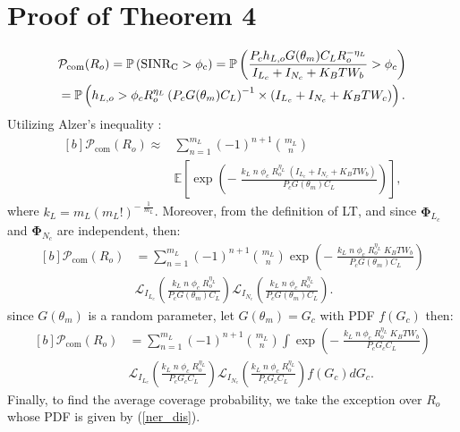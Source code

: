 \documentclass[journal]{IEEEtran}
\begin{document}
\section{Proof of Theorem 4}
\small
\begin{equation}
\begin{aligned}[b]
&\mathcal{P}_{\text{com}}(R_o)=\mathbb{P} \left(\rm{SINR_C}>\phi_c\right) =\mathbb{P}\left(\frac{P_c h_{L,o}G (\theta_m) C_L R_o^{-\eta_L}}{I_{L_c}+I_{N_c}+K_B T W_b}>\phi_c \right)\\
&=\mathbb{P}\left(h_{L,o}>\phi_c  R_o^{\eta_L}\left(P_c G (\theta_m) C_L\right)^{-1}
\times(I_{L_c}+I_{N_c}+K_B T W_c)\right).
\end{aligned}
\end{equation}
\normalsize
Utilizing Alzer’s inequality \cite{alzer1997some}:
\begin{equation}
\begin{aligned}[b]
\mathcal{P}_{\text{com}}(R_o) \approx & \sum_{n=1}^{m_L} \left(-1\right)^{n+1} {m_L \choose n}\\
&\mathbb{E}\left[\exp\left(-\;\frac{k_L\;n \;\phi_c \; R_o^{\eta_L}\; (I_{L_c}+I_{N_c}+K_B T W_b)}{P_c G (\theta_m) C_L}\right)\right],
\end{aligned}
\end{equation}
where $k_L=m_L(m_L!)^{-\;\frac{1}{m_L}}$. Moreover,
 from the definition of LT, and since \(\boldsymbol{\Phi}_{L_c}\) and \(\boldsymbol{\Phi}_{N_c}\) are independent, then:
\small
\begin{equation}
\begin{aligned}[b]
\mathcal{P}_{\text{com}}(R_o) &=\sum_{n=1}^{m_L} \left(-1\right)^{n+1} {m_L \choose n} \exp\left(-\;\frac{k_L\;n \;\phi_c \; R_o^{\eta_L}\; K_B T W_b}{P_c G (\theta_m) C_L}\right)\\
& \mathcal{L}_{I_{L_c}} \left(\frac{k_L\;n \;\phi_c \; R_o^{\eta_L}}{P_c G (\theta_m) C_L}\right) \mathcal{L}_{I_{N_c}} \left(\frac{k_L\;n \;\phi_c \; R_o^{\eta_L}}{P_c G (\theta_m) C_L}\right).
\end{aligned}
\end{equation}
\normalsize
since $G (\theta_m)$ is a random parameter, let $G (\theta_m)= G_c$ with PDF $f\left(G_c\right)$ then:
\small
\begin{equation}
\begin{aligned}[b]
\mathcal{P}_{\text{com}}(R_o)&=\sum_{n=1}^{m_L} \left(-1\right)^{n+1} {m_L \choose n} \int \exp\left(-\;\frac{k_L\;n \;\phi_c \; R_o^{\eta_L}\; K_B T W_b}{P_c G_c C_L}\right)\\
&\mathcal{L}_{I_{L_c}} \left(\frac{k_L\;n \;\phi_c \; R_o^{\eta_L}}{P_c G_c C_L}\right) \mathcal{L}_{I_{N_c}} \left(\frac{k_L\;n \;\phi_c \; R_o^{\eta_L}}{P_c G_c C_L}\right)f\left(G_c\right) dG_c.
\end{aligned}
\end{equation}
\normalsize   
Finally, to find the average coverage probability, we take the exception over $R_o$ whose PDF is given by (\ref{ner_dis}).






\end{document}
